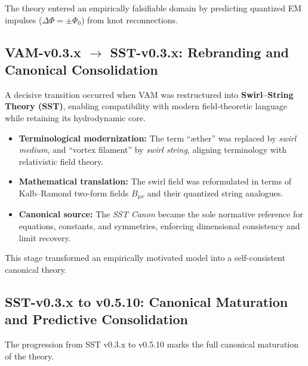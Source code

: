 \documentclass[10pt,reprint,aps,onecolumn,nofootinbib]{revtex4-2}
\begin{document}
        The theory entered an empirically falsifiable domain by predicting quantized EM impulses ($\Delta\Phi=\pm\Phi_0$) from knot reconnections.

    \subsection{VAM-v0.3.x $\rightarrow$ SST-v0.3.x: Rebranding and Canonical Consolidation}

        A decisive transition occurred when VAM was restructured into \textbf{Swirl--String Theory (SST)}, enabling compatibility with modern field-theoretic language while retaining its hydrodynamic core.

        \begin{itemize}
        \item \textbf{Terminological modernization:} The term ``æther'' was replaced by \emph{swirl medium}, and ``vortex filament'' by \emph{swirl string}, aligning terminology with relativistic field theory.
        \item \textbf{Mathematical translation:} The swirl field was reformulated in terms of Kalb--Ramond two-form fields $B_{\mu\nu}$ and their quantized string analogues.
        \item \textbf{Canonical source:} The \emph{SST Canon} became the sole normative reference for equations, constants, and symmetries, enforcing dimensional consistency and limit recovery.
        \end{itemize}

        This stage transformed an empirically motivated model into a self-consistent canonical theory.

    \subsection{SST-v0.3.x to v0.5.10: Canonical Maturation and Predictive Consolidation}

        The progression from SST v0.3.x to v0.5.10 marks the full canonical maturation of the theory.
\end{document}
